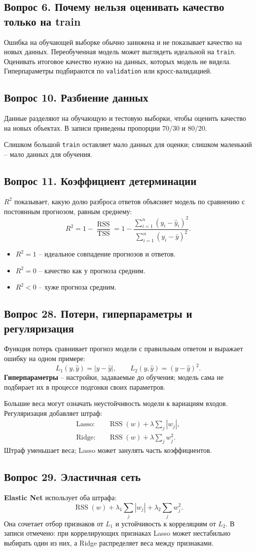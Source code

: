 \documentclass[11pt,a4paper]{article}
\newcommand{\question}[2]{\subsection{Вопрос #1. #2}}
\newcommand{\RSS}{\operatorname{RSS}}
\newcommand{\code}[1]{\texttt{#1}}
\begin{document}
\question{6}{Почему нельзя оценивать качество только на train}
Ошибка на обучающей выборке обычно занижена и не показывает качество
на новых данных. Переобученная модель может выглядеть идеальной на \code{train}.
Оценивать итоговое качество нужно на данных, которых модель не видела.
Гиперпараметры подбираются по \code{validation} или кросс-валидацией.

\question{10}{Разбиение данных}
Данные разделяют на обучающую и тестовую выборки, чтобы оценить качество
на новых объектах. В записи приведены пропорции $70/30$ и $80/20$.

Слишком большой \code{train} оставляет мало данных для оценки;
слишком маленький -- мало данных для обучения.

\question{11}{Коэффициент детерминации}
$R^2$ показывает, какую долю разброса ответов объясняет модель
по сравнению с постоянным прогнозом, равным среднему:
\[
 R^2=1-\frac{\RSS}{\operatorname{TSS}}
 =1-\frac{\sum_{i=1}^{n}(y_i-\hat y_i)^2}
 {\sum_{i=1}^{n}(y_i-\bar y)^2}.
\]
\begin{itemize}
\item $R^2=1$ -- идеальное совпадение прогнозов и ответов.
\item $R^2=0$ -- качество как у прогноза средним.
\item $R^2<0$ -- хуже прогноза средним.
\end{itemize}

\question{28}{Потери, гиперпараметры и регуляризация}
Функция потерь сравнивает прогноз модели с правильным ответом
и выражает ошибку на одном примере:
\[
 L_1(y,\hat y)=|y-\hat y|,\qquad L_2(y,\hat y)=(y-\hat y)^2.
\]
\textbf{Гиперпараметры} -- настройки, задаваемые до обучения;
модель сама не подбирает их в процессе подгонки своих параметров.

Большие веса могут означать неустойчивость модели к вариациям входов.
Регуляризация добавляет штраф:
\begin{align*}
 \text{Lasso:}\quad &\RSS(w)+\lambda\sum_j|w_j|,\\
 \text{Ridge:}\quad &\RSS(w)+\lambda\sum_jw_j^2.
\end{align*}
Штраф уменьшает веса; Lasso может занулять часть коэффициентов.

\question{29}{Эластичная сеть}
\textbf{Elastic Net} использует оба штрафа:
\[
 \RSS(w)+\lambda_1\sum_j|w_j|+\lambda_2\sum_jw_j^2.
\]
Она сочетает отбор признаков от $L_1$ и устойчивость к корреляциям от $L_2$.
В записи отмечено: при коррелирующих признаках Lasso может нестабильно
выбирать один из них, а Ridge распределяет веса между признаками.
\end{document}
